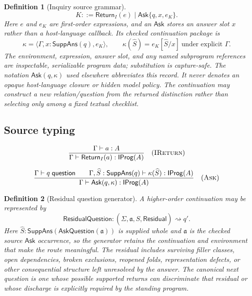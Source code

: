 \documentclass[11pt,oneside]{article}
\newtheorem{definition}{Definition}[section]
\newcommand{\AskRef}{\mathfrak a}
\begin{document}
\begin{definition}[Inquiry source grammar]
\[
\boxed{
K::=
\mathsf{Return}_I(e)
\mid
\mathsf{Ask}\{q,x,e_K\}.
}
\]
Here \(e\) and \(e_K\) are first-order expressions, and an \(\mathsf{Ask}\) stores an answer slot
\(x\) rather than a host-language callback.  Its checked continuation package is
\[
\boxed{
\kappa=\langle\Gamma,x:\mathsf{SuppAns}(q),e_K\rangle,
\qquad
\kappa(\widehat S)=e_K[\widehat S/x]\ \text{under explicit }\Gamma.
}
\]
The environment, expression, answer slot, and any named subprogram references are inspectable,
serializable program data; substitution is capture-safe.  The notation \(\mathsf{Ask}(q,\kappa)\)
used elsewhere abbreviates this record.  It never denotes an opaque host-language closure or hidden
model policy.  The continuation may construct a new relation/question from the returned distinction
rather than selecting only among a fixed textual checklist.
\end{definition}

\subsection{Source typing}

\[
\frac{\Gamma\vdash a:A}
{\Gamma\vdash\mathsf{Return}_I(a):\mathsf{IProg}(A)}
\quad(\textsc{IReturn})
\]

\[
\frac{
\Gamma\vdash q\;\mathsf{question}
\qquad
\Gamma,\widehat S:\mathsf{SuppAns}(q)\vdash\kappa(\widehat S):\mathsf{IProg}(A)
}{
\Gamma\vdash\mathsf{Ask}(q,\kappa):\mathsf{IProg}(A)
}
\quad(\textsc{Ask})
\]

\begin{definition}[Residual question generator]
A higher-order continuation may be represented by
\[
\boxed{
\mathsf{ResidualQuestion}:
(\Sigma,\AskRef,\widehat S,\mathsf{Residual})
\rightsquigarrow
q'.
}
\]
Here \(\widehat S:\mathsf{SuppAns}(\mathsf{AskQuestion}(\AskRef))\) is supplied whole and
\(\AskRef\) is the checked source \(\mathsf{Ask}\) occurrence, so the generator retains the
continuation and environment that make the route meaningful.  The residual includes surviving
filler classes, open dependencies, broken exclusions, reopened folds, representation defects, or
other consequential structure left unresolved by the answer.  The canonical next question is one
whose possible supported returns can discriminate that residual or whose discharge is explicitly
required by the standing program.
\end{definition}
\end{document}
